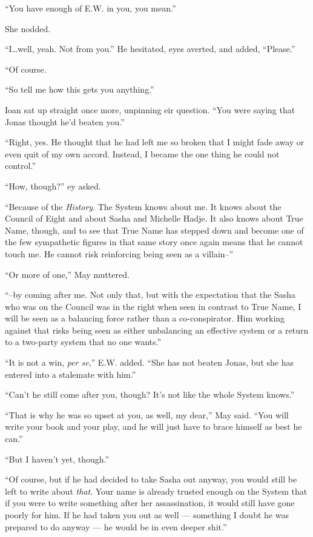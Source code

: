 ``You have enough of E.W. in you, you mean.''

She nodded.

``I\ldots well, yeah. Not from you.'' He hesitated, eyes averted, and added, ``Please.''

``Of course.

``So tell me how this gets you anything.''

Ioan sat up straight once more, unpinning eir question. ``You were saying that Jonas thought he'd beaten you.''

``Right, yes. He thought that he had left me so broken that I might fade away or even quit of my own accord. Instead, I became the one thing he could not control.''

``How, though?'' ey asked.

``Because of the \emph{History}. The System knows about me. It knows about the Council of Eight and about Sasha and Michelle Hadje. It also knows about True Name, though, and to see that True Name has stepped down and become one of the few sympathetic figures in that same story once again means that he cannot touch me. He cannot risk reinforcing being seen as a villain--''

``Or more of one,'' May muttered.

``--by coming after me. Not only that, but with the expectation that the Sasha who was on the Council was in the right when seen in contrast to True Name, I will be seen as a balancing force rather than a co-conspirator. Him working against that risks being seen as either unbalancing an effective system or a return to a two-party system that no one wants.''

``It is not a win, \emph{per se},'' E.W. added. ``She has not beaten Jonas, but she has entered into a stalemate with him.''

``Can't he still come after you, though? It's not like the whole System knows.''

``That is why he was so upset at you, as well, my dear,'' May said. ``You will write your book and your play, and he will just have to brace himself as best he can.''

``But I haven't yet, though.''

``Of course, but if he had decided to take Sasha out anyway, you would still be left to write about \emph{that}. Your name is already trusted enough on the System that if you were to write something after her assassination, it would still have gone poorly for him. If he had taken you out as well — something I doubt he was prepared to do anyway — he would be in even deeper shit.''

